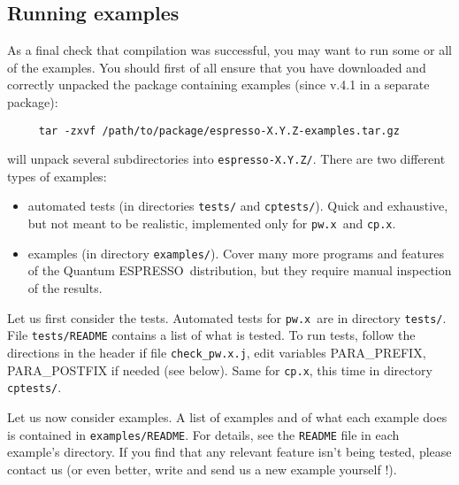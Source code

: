 \documentclass[12pt,a4paper]{article}
\def\qe{{\sc Quantum ESPRESSO}}
\def\pwx{\texttt{pw.x}}
\def\cpx{\texttt{cp.x}}
\begin{document}
\subsection{Running examples}
\label{SubSec:Examples}
As a final check that compilation was successful, you may want to run some or
all of the examples. You should first of all ensure that you have downloaded 
and correctly unpacked the package containing examples (since v.4.1 in a
separate package):
\begin{verbatim}
     tar -zxvf /path/to/package/espresso-X.Y.Z-examples.tar.gz
\end{verbatim}
will unpack several subdirectories into \texttt{espresso-X.Y.Z/}.
There are two different types of examples: 
\begin{itemize}
\item automated tests (in directories \texttt{tests/} 
and \texttt{cptests/}). Quick and exhaustive, but not
meant to be realistic, implemented only for \pwx\ and \cpx.
\item examples (in directory \texttt{examples/}).
Cover many more programs and features of the \qe\ distribution,
but they require manual inspection of the results. 
\end{itemize}

Let us first consider the tests. Automated tests for \pwx\ are in directory 
\texttt{tests/}. File \texttt{tests/README} contains a list of what is tested.
To run tests, follow the directions in the header if file 
\texttt{check\_pw.x.j}, edit variables PARA\_PREFIX, PARA\_POSTFIX 
if needed (see below). Same for \cpx, this time in directory 
\texttt{cptests/}.

Let us now consider examples. A list of examples and of what each example
does is contained in \texttt{examples/README}. 
For details, see the \texttt{README} file in each example's directory. 
If you find that any relevant feature isn't being tested, please contact us 
(or even better, write and send us a new example yourself !).
\end{document}
